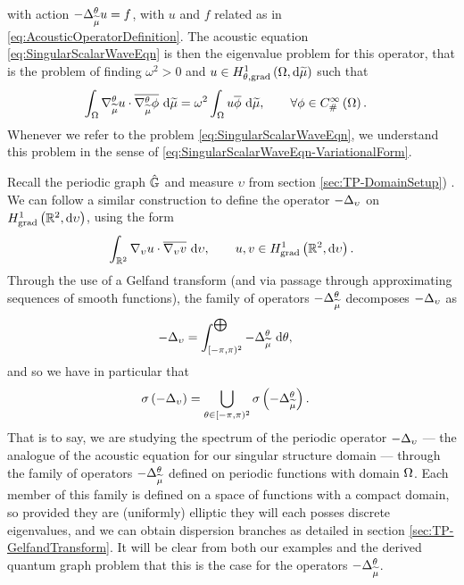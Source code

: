 with action $-\Delta_{\widetilde{\mu}}^{\theta} u = f$, with $u$ and $f$ related as in \eqref{eq:AcousticOperatorDefinition}.
The acoustic equation \eqref{eq:SingularScalarWaveEqn} is then the eigenvalue problem for this operator, that is the problem of finding $\omega^2>0$ and $u\in H^1_{\theta, \mathrm{grad}}\left( \Omega, \mathrm{d}\widetilde{\mu} \right)$ such that
\begin{align} \label{eq:SingularScalarWaveEqn-VariationalForm}
	\int_{\Omega} \nabla^{\theta}_{\widetilde{\mu}}u\cdot\overline{\nabla^{\theta}_{\widetilde{\mu}}\phi}  \ \mathrm{d}\widetilde{\mu}
	&= \omega^2 \int_{\Omega} u\overline{\phi}  \ \mathrm{d}\widetilde{\mu},
	\qquad\forall\phi\in C^{\infty}_{\#}\left( \Omega \right).
\end{align}
Whenever we refer to the problem \eqref{eq:SingularScalarWaveEqn}, we understand this problem in the sense of \eqref{eq:SingularScalarWaveEqn-VariationalForm}.

Recall the periodic graph $\hat{\mathbb{G}}$ and measure $\upsilon$ from section \ref{sec:TP-DomainSetup}) .
We can follow a similar construction to define the operator $-\Delta_{\upsilon}$ on $H^1_\mathrm{grad}\left( \mathbb{R}^2, \mathrm{d}\upsilon \right)$, using the form
\begin{align*}
	\int_{\mathbb{R}^2} \nabla_{\upsilon}u\cdot\overline{\nabla_{\upsilon}v}  \ \mathrm{d}\upsilon,
	\qquad u,v\in H^1_\mathrm{grad}\left( \mathbb{R}^2, \mathrm{d}\upsilon \right).
\end{align*}
Through the use of a Gelfand transform (and via passage through approximating sequences of smooth functions), the family of operators $-\Delta_{\widetilde{\mu}}^{\theta}$ decomposes $-\Delta_{\upsilon}$ as
\begin{align*}
	-\Delta_{\upsilon} &= \int_{[-\pi,\pi)^2}^{\bigoplus} -\Delta_{\widetilde{\mu}}^{\theta} \ \mathrm{d}\theta,
\end{align*}
and so we have in particular that
\begin{align*}
	\sigma\left(  -\Delta_{\upsilon}  \right) &= \bigcup_{\theta\in[-\pi,\pi)^2} \sigma\left(  -\Delta_{\widetilde{\mu}}^{\theta}  \right).
\end{align*}
That is to say, we are studying the spectrum of the periodic operator $-\Delta_{\upsilon}$ --- the analogue of the acoustic equation for our singular structure domain --- through the family of operators $-\Delta_{\widetilde{\mu}}^{\theta}$ defined on periodic functions with domain $\Omega$.
Each member of this family is defined on a space of functions with a compact domain, so provided they are (uniformly) elliptic they will each posses discrete eigenvalues, and we can obtain dispersion branches as detailed in section \ref{sec:TP-GelfandTransform}.
It will be clear from both our examples and the derived quantum graph problem that this is the case for the operators $-\Delta_{\widetilde{\mu}}^{\theta}$.

